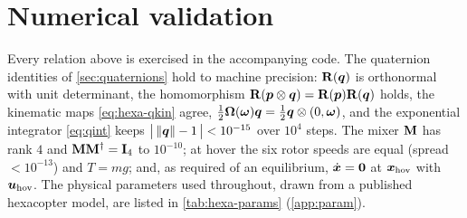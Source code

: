 \section{Numerical validation}
\label{sec:hexa-validation}

Every relation above is exercised in the accompanying code. The quaternion
identities of \cref{sec:quaternions} hold to machine precision: $\mathbf{R}(\bm{q})$
is orthonormal with unit determinant, the homomorphism
$\mathbf{R}(\bm{p}\otimes\bm{q})=\mathbf{R}(\bm{p})\mathbf{R}(\bm{q})$ holds, the
kinematic maps \cref{eq:hexa-qkin} agree,
$\tfrac12\bm{\Omega}(\bm{\omega})\bm{q}=\tfrac12\bm{q}\otimes(0,\bm{\omega})$,
and the exponential integrator \cref{eq:qint} keeps
$\bigl|\,\left\lVert \bm{q} \right\rVert-1\,\bigr|<10^{-15}$ over $10^{4}$ steps. The mixer
$\mathbf{M}$ has rank $4$ and $\mathbf{M}\mathbf{M}^{\dagger}=\mathbf{I}_4$ to
$10^{-10}$; at hover the six rotor speeds are equal (spread $<10^{-13}$) and
$T=mg$; and, as required of an equilibrium, $\dot{\bm{x}}=\bm{0}$ at
$\bm{x}_{\mathrm{hov}}$ with $\bm{u}_{\mathrm{hov}}$. The physical parameters used
throughout, drawn from a published hexacopter model, are listed in
\cref{tab:hexa-params} (\cref{app:param}).
